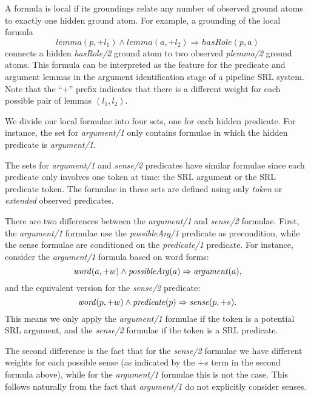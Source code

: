 
A formula is local if its groundings relate any number of observed ground atoms 
to exactly one hidden ground atom.  For example, a grounding of the local 
formula \[lemma(p,+l_1) \wedge lemma(a,+l_2) \Rightarrow hasRole(p,a)\]
connects a hidden \emph{hasRole/2} ground atom to two observed \emph{plemma/2} 
ground atoms. This formula can be interpreted as the feature for the predicate 
and argument lemmas in the argument identification stage of a pipeline SRL 
system.
Note that the ``+'' prefix indicates that there is a different weight for each 
possible pair of lemmas $(l_1,l_2)$.

We divide our local formulae into four sets, one for each hidden predicate.  For 
instance, the set for \emph{argument/1} only contains formulae in which the hidden 
predicate is \emph{argument/1}. 

The sets for \emph{argument/1} and \emph{sense/2} predicates have similar 
formulae since each predicate only involves one token at time: the SRL argument 
or the SRL predicate token. The formulae in these sets are defined using only 
\emph{token} or \emph{extended} observed predicates. 

There are two differences 
between the  \emph{argument/1} and \emph{sense/2} formulae.  First, the \emph{argument/1} formulae use 
the \emph{possibleArg/1} predicate as precondition, while the sense formulae are conditioned on the
\emph{predicate/1} predicate. For instance, consider the \emph{argument/1} 
formula based on word forms: \[\mathit{word}(a,+w) \land \mathit{possibleArg}(a) \Rightarrow 
\mathit{argument}(a),\] and the equivalent version for the \emph{sense/2} predicate: 
\[\mathit{word}(p,+w) \land \mathit{predicate}(p) \Rightarrow \mathit{sense}(p,+s).\] This means we only 
apply the \emph{argument/1} formulae if the token is a potential SRL argument, 
and the \emph{sense/2} formulae if the token is a SRL predicate. 

The second difference is the fact that for the \emph{sense/2} formulae we have different weights for each possible sense (as indicated by the $+s$ term in the second formula above), while for the \emph{argument/1} formulae this is not the case. This follows naturally from the fact that  \emph{argument/1}  do not explicitly consider senses. 


